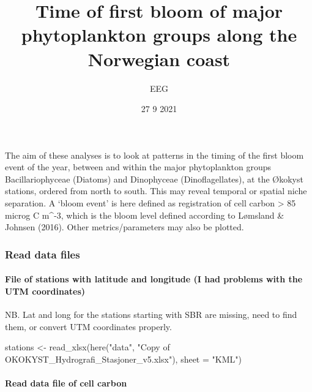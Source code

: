 \documentclass[
]{article}
\title{Time of first bloom of major phytoplankton groups along the
Norwegian coast}
\author{EEG}
\date{27 9 2021}
\newenvironment{Shaded}{\begin{snugshade}}{\end{snugshade}}
\newcommand{\AttributeTok}[1]{\textcolor[rgb]{0.77,0.63,0.00}{#1}}
\newcommand{\FunctionTok}[1]{\textcolor[rgb]{0.00,0.00,0.00}{#1}}
\newcommand{\NormalTok}[1]{#1}
\newcommand{\OtherTok}[1]{\textcolor[rgb]{0.56,0.35,0.01}{#1}}
\newcommand{\StringTok}[1]{\textcolor[rgb]{0.31,0.60,0.02}{#1}}
\begin{document}
\maketitle

The aim of these analyses is to look at patterns in the timing of the
first bloom event of the year, between and within the major
phytoplankton groups Bacillariophyceae (Diatoms) and Dinophyceae
(Dinoflagellates), at the Økokyst stations, ordered from north to south.
This may reveal temporal or spatial niche separation. A `bloom event' is
here defined as registration of cell carbon \textgreater{} 85 microg C
m\^{}-3, which is the bloom level defined according to Lømsland \&
Johnsen (2016). Other metrics/parameters may also be plotted.

\hypertarget{read-data-files}{%
\subsubsection{Read data files}\label{read-data-files}}

\hypertarget{file-of-stations-with-latitude-and-longitude-i-had-problems-with-the-utm-coordinates}{%
\paragraph{File of stations with latitude and longitude (I had problems
with the UTM
coordinates)}\label{file-of-stations-with-latitude-and-longitude-i-had-problems-with-the-utm-coordinates}}

NB. Lat and long for the stations starting with SBR are missing, need to
find them, or convert UTM coordinates properly.

\begin{Shaded}
\begin{Highlighting}[]
\NormalTok{stations }\OtherTok{\textless{}{-}} \FunctionTok{read\_xlsx}\NormalTok{(}\FunctionTok{here}\NormalTok{(}\StringTok{"data"}\NormalTok{, }\StringTok{"Copy of OKOKYST\_Hydrografi\_Stasjoner\_v5.xlsx"}\NormalTok{), }\AttributeTok{sheet =} \StringTok{"KML"}\NormalTok{)}
\end{Highlighting}
\end{Shaded}

\hypertarget{read-data-file-of-cell-carbon}{%
\paragraph{Read data file of cell
carbon}\label{read-data-file-of-cell-carbon}}
\end{document}
